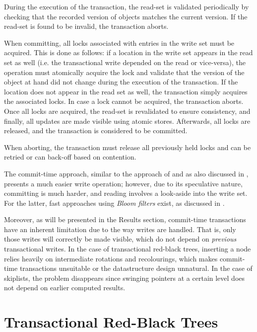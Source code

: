 During the execution of the transaction, the read-set is validated periodically by checking that the recorded version of objects matches the current version. If the read-set is found to be invalid, the transaction aborts.

When committing, all locks associated with entries in the write set must be acquired. This is done as follows: if a location in the write set appears in the read set as well (i.e. the transactional write depended on the read or vice-versa), the operation must atomically acquire the lock and validate that the version of the object at hand did not change during the execution of the transaction. If the location does not appear in the read set as well, the transaction simply acquires the associated locks. In case a lock cannot be acquired, the transaction aborts. Once all locks are acquired, the read-set is revalidated to ensure consistency, and finally, all updates are made visible using atomic stores. Afterwards, all locks are released, and the transaction is considered to be committed.

When aborting, the transaction must release all previously held locks and can be retried or can back-off based on contention.

The commit-time approach, similar to the approach of \cite{tl} and as also discussed in \cite{tl, tl2, book}, presents a much easier write operation; however, due to its speculative nature, committing is much harder, and reading involves a look-aside into the write set. For the latter, fast approaches using \textit{Bloom filters} exist, as discussed in \cite{tl2}.

Moreover, as will be presented in the Results section, commit-time transactions have an inherent limitation due to the way writes are handled. That is, only those writes will correctly be made visible, which do not depend on \textit{previous} transactional writes. In the case of transactional red-black trees, inserting a node relies heavily on intermediate rotations and recolourings, which makes commit-time transactions unsuitable or the datastructure design unnatural. In the case of skiplists, the problem disappears since swinging pointers at a certain level does not depend on earlier computed results. 

\FloatBarrier
\section{Transactional Red-Black Trees}
\label{section:trb}

